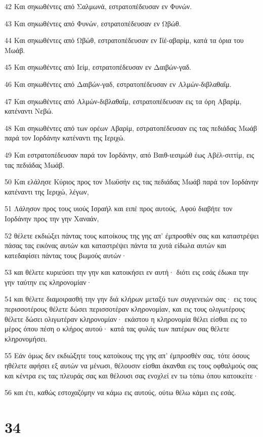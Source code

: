 \par 42 Και σηκωθέντες από Σαλμωνά, εστρατοπέδευσαν εν Φυνών.
\par 43 Και σηκωθέντες από Φυνών, εστρατοπέδευσαν εν Ωβώθ.
\par 44 Και σηκωθέντες από Ωβώθ, εστρατοπέδευσαν εν Ιϊέ-αβαρίμ, κατά τα όρια του Μωάβ.
\par 45 Και σηκωθέντες από Ιείμ, εστρατοπέδευσαν εν Δαιβών-γαδ.
\par 46 Και σηκωθέντες από Δαιβών-γαδ, εστρατοπέδευσαν εν Αλμών-διβλαθαΐμ.
\par 47 Και σηκωθέντες από Αλμών-διβλαθαΐμ, εστρατοπέδευσαν εις τα όρη Αβαρίμ, κατέναντι Νεβώ.
\par 48 Και σηκωθέντες από των ορέων Αβαρίμ, εστρατοπέδευσαν εις τας πεδιάδας Μωάβ παρά τον Ιορδάνην κατέναντι της Ιεριχώ.
\par 49 Και εστρατοπέδευσαν παρά τον Ιορδάνην, από Βαιθ-ιεσιμώθ έως Αβέλ-σιττίμ, εις τας πεδιάδας Μωάβ.
\par 50 Και ελάλησε Κύριος προς τον Μωϋσήν εις τας πεδιάδας Μωάβ παρά τον Ιορδάνην κατέναντι της Ιεριχώ, λέγων,
\par 51 Λάλησον προς τους υιούς Ισραήλ και ειπέ προς αυτούς, Αφού διαβήτε τον Ιορδάνην προς την γην Χαναάν,
\par 52 θέλετε εκδιώξει πάντας τους κατοίκους της γης απ' έμπροσθέν σας και καταστρέψει πάσας τας εικόνας αυτών και καταστρέψει πάντα τα χυτά είδωλα αυτών και κατεδαφίσει πάντας τους βωμούς αυτών·
\par 53 και θέλετε κυριεύσει την γην και κατοικήσει εν αυτή· διότι εις εσάς έδωκα την γην ταύτην εις κληρονομίαν·
\par 54 και θέλετε διαμοιρασθή την γην διά κλήρων μεταξύ των συγγενειών σας· εις τους περισσοτέρους θέλετε δώσει περισσοτέραν κληρονομίαν, και εις τους ολιγωτέρους θέλετε δώσει ολιγωτέραν κληρονομίαν· εκάστου η κληρονομία θέλει είσθαι εις το μέρος όπου πέση ο κλήρος αυτού· κατά τας φυλάς των πατέρων σας θέλετε κληρονομήσει.
\par 55 Εάν όμως δεν εκδιώξητε τους κατοίκους της γης απ' έμπροσθέν σας, τότε όσους ηθέλετε αφήσει εξ αυτών να μένωσι, θέλουσιν είσθαι άκανθαι εις τους οφθαλμούς σας και κέντρα εις τας πλευράς σας και θέλουσι σας ενοχλεί εν τω τόπω όπου κατοικείτε·
\par 56 και έτι, καθώς εστοχαζόμην να κάμω εις αυτούς, ούτω θέλω κάμει εις εσάς.

\chapter{34}

